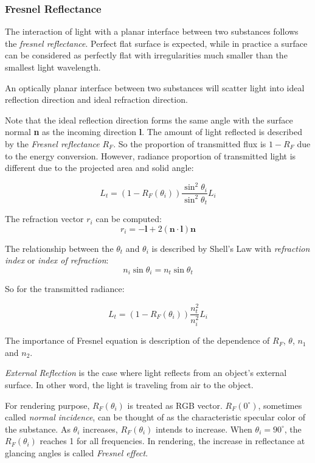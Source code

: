 \documentclass[10pt, a4paper]{article}
\begin{document}
        \subsubsection{Fresnel Reflectance}
            The interaction of light with a planar interface between two substances follows the \emph{fresnel reflectance}. Perfect flat surface is expected, while in practice a surface can be considered as perfectly flat with irregularities much smaller than the smallest light wavelength. 
            
            An optically planar interface between two substances will scatter light into ideal reflection direction and ideal refraction direction. 

            Note that the ideal reflection direction forms the same angle with the surface normal \textbf{n} as the incoming direction \textbf{l}. The amount of light reflected is described by the \emph{Fresnel reflectance} $R_F$. So the proportion of transmitted flux is $1 - R_F$ due to the energy conversion. However, radiance proportion of transmitted light is different due to the projected area and solid angle: 
            
            $$L_t = (1 - R_F(\theta_i))\frac{\sin^2{\theta_i}}{\sin^2{\theta_t}}L_i $$

            The refraction vector $r_i$ can be computed: 
            $$r_i = -\textbf{l} + 2(\textbf{n}\cdot\textbf{l})\textbf{n}$$

            The relationship between the $\theta_t$ and $\theta_i$ is described by Shell's Law with \emph{refraction index} or \emph{index of refraction}:
            $$n_i\sin{\theta_i} = n_t\sin{\theta_t}$$

            So for the transmitted radiance:

            $$L_t = (1 - R_F(\theta_i))\frac{n_t^2}{n_i^2}L_i $$

            The importance of Fresnel equation is description of the dependence of $R_F$, $\theta$, $n_1$ and $n_2$.\newline 

            \emph{External Reflection} is the case where light reflects from an object's external surface. In other word, the light is traveling from air to the object. 

            For rendering purpose, $R_F(\theta_i)$ is treated as RGB vector. $R_F(0^{\circ})$, sometimes called \emph{normal incidence}, can be thought of as the characteristic specular color of the substance. As $\theta_i$ increases, $R_F(\theta_i)$ intends to increase. When $\theta_i = 90^{\circ}$, the $R_F(\theta_i)$ reaches 1 for all frequencies. In rendering, the increase in reflectance at glancing angles is called \emph{Fresnel effect}.
\end{document}
